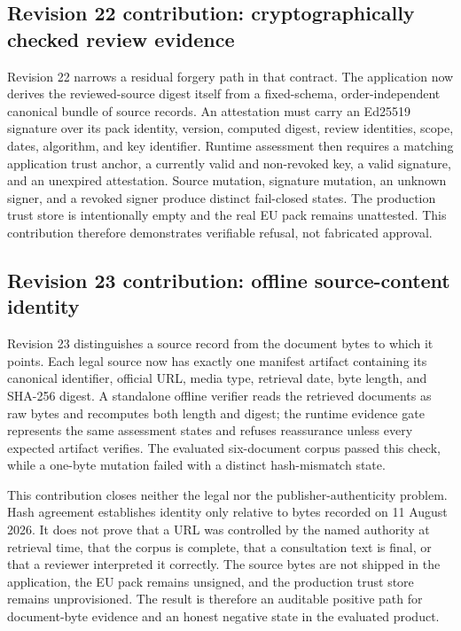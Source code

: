 \subsection{Revision 22 contribution: cryptographically checked review evidence}

Revision 22 narrows a residual forgery path in that contract. The application now derives the reviewed-source digest itself from a fixed-schema, order-independent canonical bundle of source records. An attestation must carry an Ed25519 signature over its pack identity, version, computed digest, review identities, scope, dates, algorithm, and key identifier. Runtime assessment then requires a matching application trust anchor, a currently valid and non-revoked key, a valid signature, and an unexpired attestation. Source mutation, signature mutation, an unknown signer, and a revoked signer produce distinct fail-closed states. The production trust store is intentionally empty and the real EU pack remains unattested. This contribution therefore demonstrates verifiable refusal, not fabricated approval.

\subsection{Revision 23 contribution: offline source-content identity}

Revision 23 distinguishes a source record from the document bytes to which it points. Each legal source now has exactly one manifest artifact containing its canonical identifier, official URL, media type, retrieval date, byte length, and SHA-256 digest. A standalone offline verifier reads the retrieved documents as raw bytes and recomputes both length and digest; the runtime evidence gate represents the same assessment states and refuses reassurance unless every expected artifact verifies. The evaluated six-document corpus passed this check, while a one-byte mutation failed with a distinct hash-mismatch state.

This contribution closes neither the legal nor the publisher-authenticity problem. Hash agreement establishes identity only relative to bytes recorded on 11 August 2026. It does not prove that a URL was controlled by the named authority at retrieval time, that the corpus is complete, that a consultation text is final, or that a reviewer interpreted it correctly. The source bytes are not shipped in the application, the EU pack remains unsigned, and the production trust store remains unprovisioned. The result is therefore an auditable positive path for document-byte evidence and an honest negative state in the evaluated product.
